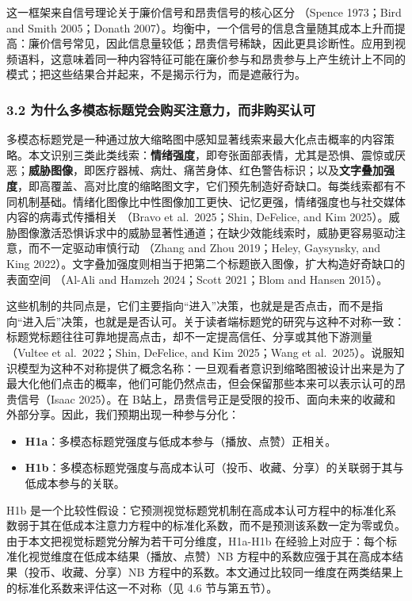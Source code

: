 \documentclass[
  fontset=none]{ctexart}
\providecommand{\tightlist}{%
  \setlength{\itemsep}{0pt}\setlength{\parskip}{0pt}}
\begin{document}
这一框架来自信号理论关于廉价信号和昂贵信号的核心区分 （Spence 1973；Bird and Smith 2005；Donath 2007）。均衡中，一个信号的信息含量随其成本上升而提高：廉价信号常见，因此信息量较低；昂贵信号稀缺，因此更具诊断性。应用到视频语料，这意味着同一种内容特征可能在廉价参与和昂贵参与上产生统计上不同的模式；把这些结果合并起来，不是揭示行为，而是遮蔽行为。

\subsubsection{3.2 为什么多模态标题党会购买注意力，而非购买认可}\label{ux4e3aux4ec0ux4e48ux591aux6a21ux6001ux6807ux9898ux515aux4f1aux8d2dux4e70ux6ce8ux610fux529bux800cux975eux8d2dux4e70ux8ba4ux53ef}

多模态标题党是一种通过放大缩略图中感知显著线索来最大化点击概率的内容策略。本文识别三类此类线索：\textbf{情绪强度}，即夸张面部表情，尤其是恐惧、震惊或厌恶；\textbf{威胁图像}，即医疗器械、病灶、痛苦身体、红色警告标识；以及\textbf{文字叠加强度}，即高覆盖、高对比度的缩略图文字，它们预先制造好奇缺口。每类线索都有不同机制基础。情绪化图像比中性图像加工更快、记忆更强，情绪强度也与社交媒体内容的病毒式传播相关 （Bravo et al.~2025；Shin, DeFelice, and Kim 2025）。威胁图像激活恐惧诉求中的威胁显著性通道；在缺少效能线索时，威胁更容易驱动注意，而不一定驱动审慎行动 （Zhang and Zhou 2019；Heley, Gaysynsky, and King 2022）。文字叠加强度则相当于把第二个标题嵌入图像，扩大构造好奇缺口的表面空间 （Al-Ali and Hamzeh 2024；Scott 2021；Blom and Hansen 2015）。

这些机制的共同点是，它们主要指向``进入''决策，也就是是否点击，而不是指向``进入后''决策，也就是是否认可。关于读者端标题党的研究与这种不对称一致：标题党标题往往可靠地提高点击，却不一定提高信任、分享或其他下游测量（Vultee et al.~2022；Shin, DeFelice, and Kim 2025；Wang et al.~2025）。说服知识模型为这种不对称提供了概念名称：一旦观看者意识到缩略图被设计出来是为了最大化他们点击的概率，他们可能仍然点击，但会保留那些本来可以表示认可的昂贵信号（Isaac 2025）。在 B站上，昂贵信号正是受限的投币、面向未来的收藏和外部分享。因此，我们预期出现一种参与分化：

\begin{itemize}
\tightlist
\item
  \textbf{H1a}：多模态标题党强度与低成本参与（播放、点赞）正相关。
\item
  \textbf{H1b}：多模态标题党强度与高成本认可（投币、收藏、分享）的关联弱于其与低成本参与的关联。
\end{itemize}

H1b 是一个比较性假设：它预测视觉标题党机制在高成本认可方程中的标准化系数弱于其在低成本注意力方程中的标准化系数，而不是预测该系数一定为零或负。由于本文把视觉标题党分解为若干可分维度，H1a-H1b 在经验上对应于：每个标准化视觉维度在低成本结果（播放、点赞）NB 方程中的系数应强于其在高成本结果（投币、收藏、分享）NB 方程中的系数。本文通过比较同一维度在两类结果上的标准化系数来评估这一不对称（见 4.6 节与第五节）。
\end{document}
